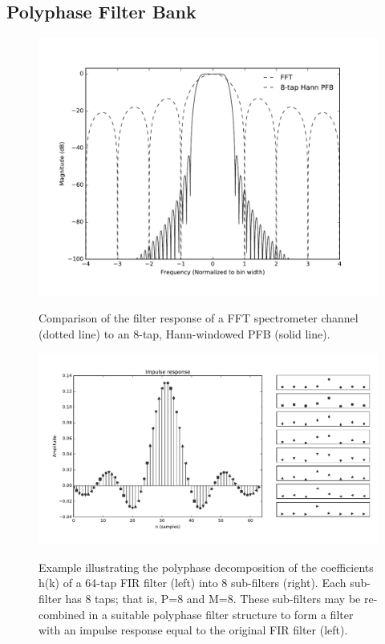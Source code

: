 \documentclass{ws-rv961x669}
\begin{document}
\subsection{Polyphase Filter Bank}

\begin{figure}
 \centering
 \includegraphics[width=\textwidth]{./figures/pfb_resp}
 \label{fig:pfb_response}
 \caption{Comparison of the filter response of a FFT spectrometer channel (dotted line) to an 8-tap, Hann-windowed PFB (solid line).}
\end{figure}

\begin{figure}
 \centering
 \includegraphics[width=\textwidth]{./figures/pfb_taps}
 \label{fig:pfb_taps}
 \caption{Example illustrating the polyphase decomposition of the coefficients h(k) of a 64-tap FIR filter (left) into 8 sub-filters (right). Each sub-filter has 8 taps; that is, P=8 and M=8. These sub-filters may be re-combined in a suitable polyphase filter structure to form a filter with an impulse response equal to the original FIR filter (left).}
\end{figure}
\end{document}
